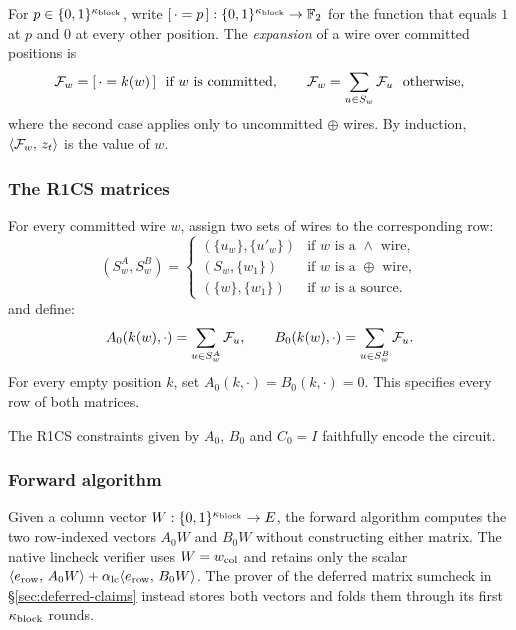 For $p\in\{0,1\}^{\kappa_{\mathrm{block}}}$, write $[\,\cdot=p\,]:\{0,1\}^{\kappa_{\mathrm{block}}}\to\mathbb{F}_2$ for the function that equals $1$ at $p$ and $0$ at every other position. The \emph{expansion} of a wire over committed positions is
\begin{equation}\label{flock:eq:expand}
\mathcal{F}_{w}=[\,\cdot=k(w)\,]\ \text{ if $w$ is committed},\qquad \mathcal{F}_{w}=\sum_{u\in S_w}\mathcal{F}_{u}\ \text{ otherwise},
\end{equation}
where the second case applies only to uncommitted $\oplus$ wires. By induction, $\langle \mathcal{F}_{w},\, z_t \rangle$ is the value of $w$.

\subsubsection{The R1CS matrices}\label{flock:rows}

For every committed wire $w$, assign two sets of wires to the corresponding row:
\[
(S^A_w,S^B_w)=
\begin{cases}
(\{u_w\},\{u'_w\}) & \text{if $w$ is a $\wedge$ wire},\\
(S_w,\{w_1\}) & \text{if $w$ is a $\oplus$ wire},\\
(\{w\},\{w_1\}) & \text{if $w$ is a source}.
\end{cases}
\]
and define:
\begin{equation}\label{flock:eq:row-lists}
A_0(k(w),\cdot)=\sum_{u\in S^A_w}\mathcal{F}_{u},\qquad B_0(k(w),\cdot)=\sum_{u\in S^B_w}\mathcal{F}_{u}.
\end{equation}
For every empty position $k$, set $A_0(k,\cdot)=B_0(k,\cdot)=0$. This specifies every row of both matrices.

\vspace{3mm}

The R1CS constraints given by $A_0$, $B_0$ and $C_0=I$ faithfully encode the circuit.
\subsubsection{Forward algorithm}\label{flock:forward}

Given a column vector $W:\{0,1\}^{\kappa_{\mathrm{block}}}\to E$, the forward algorithm computes the two row-indexed vectors $A_0W$ and $B_0W$ without constructing either matrix. The native lincheck verifier uses $W=w_{\mathrm{col}}$ and retains only the scalar $\langle e_{\mathrm{row}},\, A_0W \rangle+\alpha_{\mathrm{lc}}\langle e_{\mathrm{row}},\, B_0W \rangle$. The prover of the deferred matrix sumcheck in \S\ref{sec:deferred-claims} instead stores both vectors and folds them through its first $\kappa_{\mathrm{block}}$ rounds.


